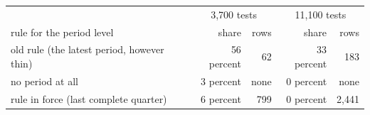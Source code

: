 \begin{tabular}{lrrrr}
\toprule
& \multicolumn{2}{c}{3,700 tests} & \multicolumn{2}{c}{11,100 tests} \\
rule for the period level & share & rows & share & rows \\
\midrule
old rule (the latest period, however thin) & 56 percent & 62 & 33 percent & 183 \\
no period at all & 3 percent & none & 0 percent & none \\
rule in force (last complete quarter) & 6 percent & 799 & 0 percent & 2,441 \\
\bottomrule
\end{tabular}
